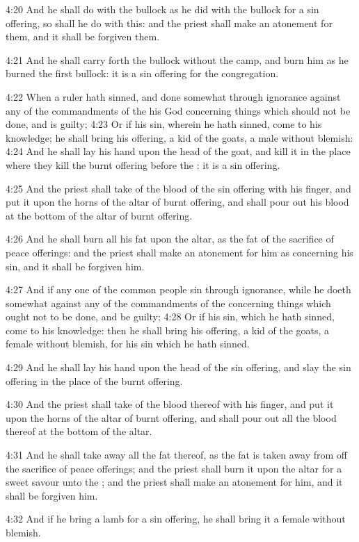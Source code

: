 4:20 And he shall do with the bullock as he did with the bullock for a
sin offering, so shall he do with this: and the priest shall make an
atonement for them, and it shall be forgiven them.

4:21 And he shall carry forth the bullock without the camp, and burn
him as he burned the first bullock: it is a sin offering for the
congregation.

4:22 When a ruler hath sinned, and done somewhat through ignorance
against any of the commandments of the \LORD his God concerning things
which should not be done, and is guilty; 4:23 Or if his sin, wherein
he hath sinned, come to his knowledge; he shall bring his offering, a
kid of the goats, a male without blemish: 4:24 And he shall lay his
hand upon the head of the goat, and kill it in the place where they
kill the burnt offering before the \LORD: it is a sin offering.

4:25 And the priest shall take of the blood of the sin offering with
his finger, and put it upon the horns of the altar of burnt offering,
and shall pour out his blood at the bottom of the altar of burnt
offering.

4:26 And he shall burn all his fat upon the altar, as the fat of the
sacrifice of peace offerings: and the priest shall make an atonement
for him as concerning his sin, and it shall be forgiven him.

4:27 And if any one of the common people sin through ignorance, while
he doeth somewhat against any of the commandments of the \LORD
concerning things which ought not to be done, and be guilty; 4:28 Or
if his sin, which he hath sinned, come to his knowledge: then he shall
bring his offering, a kid of the goats, a female without blemish, for
his sin which he hath sinned.

4:29 And he shall lay his hand upon the head of the sin offering, and
slay the sin offering in the place of the burnt offering.

4:30 And the priest shall take of the blood thereof with his finger,
and put it upon the horns of the altar of burnt offering, and shall
pour out all the blood thereof at the bottom of the altar.

4:31 And he shall take away all the fat thereof, as the fat is taken
away from off the sacrifice of peace offerings; and the priest shall
burn it upon the altar for a sweet savour unto the \LORD; and the
priest shall make an atonement for him, and it shall be forgiven him.

4:32 And if he bring a lamb for a sin offering, he shall bring it a
female without blemish.


